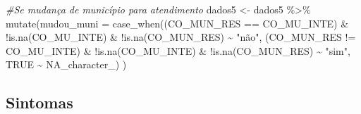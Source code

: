 \documentclass[
]{article}
\newenvironment{Shaded}{\begin{snugshade}}{\end{snugshade}}
\newcommand{\AttributeTok}[1]{\textcolor[rgb]{0.77,0.63,0.00}{#1}}
\newcommand{\CommentTok}[1]{\textcolor[rgb]{0.56,0.35,0.01}{\textit{#1}}}
\newcommand{\ConstantTok}[1]{\textcolor[rgb]{0.00,0.00,0.00}{#1}}
\newcommand{\FunctionTok}[1]{\textcolor[rgb]{0.00,0.00,0.00}{#1}}
\newcommand{\NormalTok}[1]{#1}
\newcommand{\OtherTok}[1]{\textcolor[rgb]{0.56,0.35,0.01}{#1}}
\newcommand{\SpecialCharTok}[1]{\textcolor[rgb]{0.00,0.00,0.00}{#1}}
\newcommand{\StringTok}[1]{\textcolor[rgb]{0.31,0.60,0.02}{#1}}
\begin{document}
\begin{Shaded}
\begin{Highlighting}[]
\CommentTok{\#Se mudança de município para atendimento}
\NormalTok{dados5 }\OtherTok{\textless{}{-}}\NormalTok{ dados5 }\SpecialCharTok{\%\textgreater{}\%}
  \FunctionTok{mutate}\NormalTok{(}\AttributeTok{mudou\_muni =} \FunctionTok{case\_when}\NormalTok{((CO\_MUN\_RES }\SpecialCharTok{==}\NormalTok{ CO\_MU\_INTE) }\SpecialCharTok{\&}
                                  \SpecialCharTok{!}\FunctionTok{is.na}\NormalTok{(CO\_MU\_INTE) }\SpecialCharTok{\&}
                                  \SpecialCharTok{!}\FunctionTok{is.na}\NormalTok{(CO\_MUN\_RES) }\SpecialCharTok{\textasciitilde{}} \StringTok{"não"}\NormalTok{,}
\NormalTok{                                (CO\_MUN\_RES }\SpecialCharTok{!=}\NormalTok{ CO\_MU\_INTE) }\SpecialCharTok{\&}
                                  \SpecialCharTok{!}\FunctionTok{is.na}\NormalTok{(CO\_MU\_INTE) }\SpecialCharTok{\&}
                                  \SpecialCharTok{!}\FunctionTok{is.na}\NormalTok{(CO\_MUN\_RES) }\SpecialCharTok{\textasciitilde{}} \StringTok{"sim"}\NormalTok{,}
                                \ConstantTok{TRUE} \SpecialCharTok{\textasciitilde{}} \ConstantTok{NA\_character\_}\NormalTok{)}
\NormalTok{  )}
\end{Highlighting}
\end{Shaded}

\hypertarget{sintomas}{%
\subsection{Sintomas}\label{sintomas}}
\end{document}
